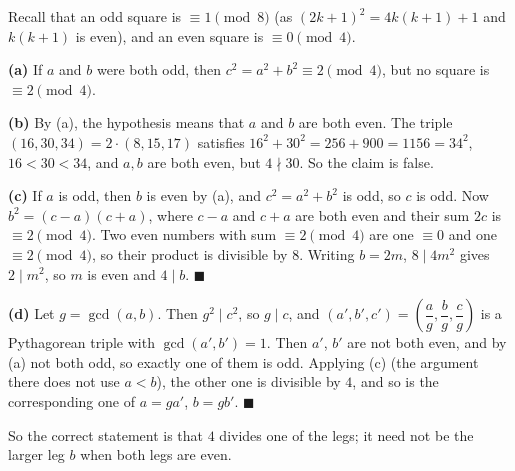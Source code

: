 Recall that an odd square is $\equiv1\pmod 8$ (as $(2k+1)^2=4k(k+1)+1$ and $k(k+1)$ is even), and an even square is $\equiv0\pmod4$.

\textbf{(a)} If $a$ and $b$ were both odd, then $c^2=a^2+b^2\equiv2\pmod4$, but no square is $\equiv2\pmod4$.

\textbf{(b)} By (a), the hypothesis means that $a$ and $b$ are both even. The triple $(16,30,34)=2\cdot(8,15,17)$ satisfies $16^2+30^2=256+900=1156=34^2$, $16<30<34$, and $a,b$ are both even, but $4\nmid30$. So the claim is false.

\textbf{(c)} If $a$ is odd, then $b$ is even by (a), and $c^2=a^2+b^2$ is odd, so $c$ is odd. Now $b^2=(c-a)(c+a)$, where $c-a$ and $c+a$ are both even and their sum $2c$ is $\equiv2\pmod4$. Two even numbers with sum $\equiv2\pmod4$ are one $\equiv0$ and one $\equiv2\pmod4$, so their product is divisible by $8$. Writing $b=2m$, $8\mid4m^2$ gives $2\mid m^2$, so $m$ is even and $4\mid b$. $\blacksquare$

\textbf{(d)} Let $g=\gcd(a,b)$. Then $g^2\mid c^2$, so $g\mid c$, and $(a',b',c')=\left(\dfrac ag,\dfrac bg,\dfrac cg\right)$ is a Pythagorean triple with $\gcd(a',b')=1$. Then $a'$, $b'$ are not both even, and by (a) not both odd, so exactly one of them is odd. Applying (c) (the argument there does not use $a<b$), the other one is divisible by $4$, and so is the corresponding one of $a=ga'$, $b=gb'$. $\blacksquare$

So the correct statement is that $4$ divides one of the legs; it need not be the larger leg $b$ when both legs are even.
